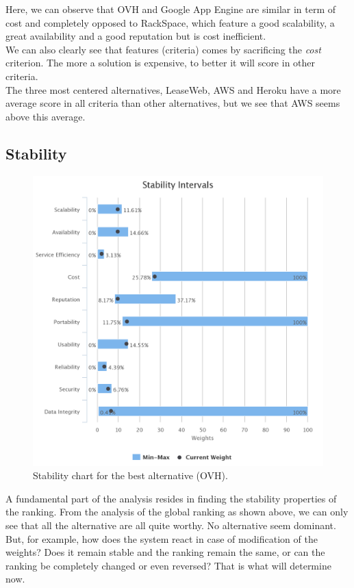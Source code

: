 \documentclass[a4paper,11pt]{article}
\begin{document}
Here, we can observe that OVH and Google App Engine are similar in term of cost and completely opposed to RackSpace, which feature a good scalability, a great availability and a good reputation but is cost inefficient. \\
We can also clearly see that features (criteria) comes by sacrificing the \emph{cost} criterion. The more a solution is expensive, to better it will score in other criteria.\\
The three most centered alternatives, LeaseWeb, AWS and Heroku have a more average score in all criteria than other alternatives, but we see that AWS seems above this average.\\

\subsection{Stability}

\begin{figure}
  \centering
  \includegraphics[width=\textwidth-4cm]{img/Result/stability_chart.png}
  \caption{Stability chart for the best alternative (OVH).}
  \label{fig:stab}
\end{figure}

A fundamental part of the analysis resides in finding the stability properties of the ranking. From the analysis of the global ranking as shown above, we can only see that all the alternative are all quite worthy. No alternative seem dominant. But, for example, how does the system react in case of modification of the weights? Does it remain stable and the ranking remain the same, or can the ranking be completely changed or even reversed? That is what will determine now.\\
\end{document}
